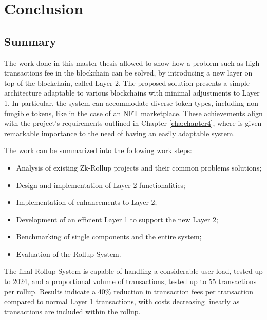 \chapter{Conclusion\label{cha:chapter8}}

\section{Summary\label{sec:summary}}

The work done in this master thesis allowed to show how a problem such as high transactions fee in the blockchain can be solved, by introducing a new layer on top of the blockchain, called Layer 2. The proposed solution presents a simple architecture adaptable to various blockchains with minimal adjustments to Layer 1. In particular, the system can accommodate diverse token types, including non-fungible tokens, like in the case of an NFT marketplace. These achievements align with the project's requirements outlined in Chapter \ref{cha:chapter4}, where is given remarkable importance to the need of having an easily adaptable system.

\noindent The work can be summarized into the following work steps:
\vspace{-0.11in}
\begin{itemize}
	\item Analysis of existing Zk-Rollup projects and their common problems solutions;
	      \vspace{-0.11in}
	\item Design and implementation of Layer 2 functionalities;
	      \vspace{-0.11in}
	\item Implementation of enhancements to Layer 2;
	      \vspace{-0.11in}
	\item Development of an efficient Layer 1 to support the new Layer 2;
	      \vspace{-0.11in}
	\item Benchmarking of single components and the entire system;
	      \vspace{-0.11in}
	\item Evaluation of the Rollup System.
\end{itemize}

The final Rollup System is capable of handling a considerable user load, tested up to 2024, and a proportional volume of transactions, tested up to 55 transactions per rollup. Results indicate a 40\% reduction in transaction fees per transaction compared to normal Layer 1 transactions, with costs decreasing linearly as transactions are included within the rollup.

